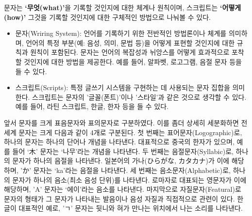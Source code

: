 \documentclass[
  letterpaper,
]{book}
\begin{document}
\begin{tcolorbox}[enhanced jigsaw, opacityback=0, opacitybacktitle=0.6, colback=white, rightrule=.15mm, coltitle=black, colframe=quarto-callout-note-color-frame, colbacktitle=quarto-callout-note-color!10!white, bottomrule=.15mm, bottomtitle=1mm, breakable, title=\textcolor{quarto-callout-note-color}{\faInfo}\hspace{0.5em}{문자와 스크립트}, titlerule=0mm, leftrule=.75mm, toptitle=1mm, left=2mm, arc=.35mm, toprule=.15mm]

문자는 \textbf{`무엇(what)'}을 기록할 것인지에 대한 체계나 원칙이며,
스크립트는 \textbf{`어떻게(how)'} 그것을 기록할 것인지에 대한 구체적인
방법으로 나눠볼 수 있다.

\begin{itemize}
\item
  문자(Wriring System): 언어를 기록하기 위한 전반적인 방법론이나 체계를
  의미하며, 언어의 특정 부분(예: 음성, 의미, 문법 등)을 어떻게 표현할
  것인지에 대한 규칙과 원칙이 포함된다. 문자는 언어의 복잡성과 뉘앙스를
  어떻게 효과적으로 포착할 것인지에 대한 방법을 제공한다. 예를 들어,
  알파벳, 로고그램, 음절 문자 등을 들 수 있다.
\item
  스크립트(Scripts): 특정 글쓰기 시스템을 구현하는 데 사용되는 문자
  집합을 의미한다. 스크립트는 문자의 '글꼴(폰트)'이나 '스타일'과 같은
  것으로 생각할 수 있다. 예를 들어, 라틴 스크립트, 한글, 한자 등을 들 수
  있다.
\end{itemize}

\end{tcolorbox}

앞서 문자를 크게 표음문자와 표의문자로 구분하였다. 이를 좀더 상세히
세분화하면 전세계 문자는 크게 다음과 같이 4개로 구분된다. 첫 번째는
표어문자(Logographic)로, 하나의 문자는 하나의 단어나 개념을 나타낸다.
대표적으로 중국의 한자가 있으며, 예를 들어 `木' 문자는 `나무'라는 개념을
나타낸다. 두 번째는 음절문자(Syllabic)로, 하나의 문자가 하나의 음절을
나타낸다. 일본어의 가나(ひらがな, カタカナ)가 이에 해당하며, 'か' 문자는
`ka'라는 음절을 나타낸다. 세 번째는 음소문자(Alphabetic)로, 하나의
문자가 하나의 음소(최소 음성 단위)를 나타낸다. 로마자로 대표되는
영문자가 이에 해당하며, 'A' 문자는 `에이'라는 음소를 나타낸다.
마지막으로 자질문자(Featural)로 문자의 형태가 그 문자가 나타내는
발음이나 음성 자질과 직접적으로 관련이 있다. 한글이 대표적인 예로, 'ㄱ'
문자는 뒷니와 혀가 만나는 위치에서 나는 소리를 나타낸다.
\autocite{gohos2010}
\end{document}
